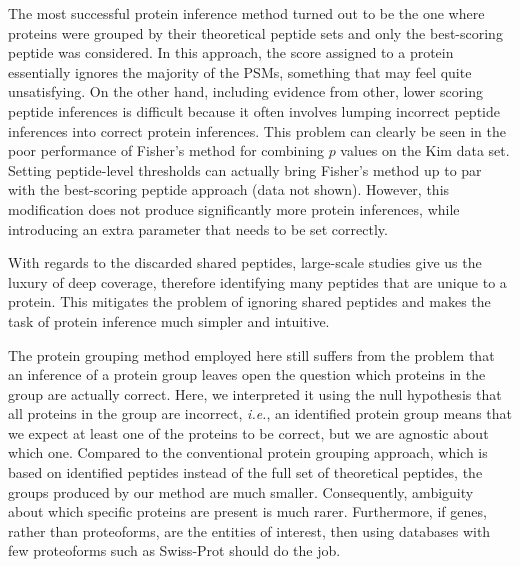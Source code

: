 \documentclass{article}
\begin{document}
The most successful protein inference method turned out to be the one
where proteins were grouped by their theoretical peptide sets and only
the best-scoring peptide was considered. In this approach, the score
assigned to a protein essentially ignores the majority of the PSMs,
something that may feel quite unsatisfying. On the other hand,
including evidence from other, lower scoring peptide inferences
is difficult because it often involves lumping incorrect peptide
inferences into correct protein inferences.  This problem
can clearly be seen in the poor performance of Fisher's method for
combining $p$ values on the Kim data set. Setting peptide-level
thresholds can actually bring Fisher's method up to par with the
best-scoring peptide approach (data not shown). However, this
modification does not produce significantly more protein
inferences, while introducing an extra parameter that needs to be
set correctly.

With regards to the discarded shared peptides, large-scale studies
give us the luxury of deep coverage, therefore identifying many
peptides that are unique to a protein. This mitigates the problem of
ignoring shared peptides and makes the task of protein inference much
simpler and intuitive.  

The protein grouping method employed here still suffers from the
problem that an inference of a protein group leaves open the
question which proteins in the group are actually correct. Here, we
interpreted it using the null hypothesis that all proteins in the
group are incorrect, {\em i.e.}, an identified protein group means
that we expect at least one of the proteins to be correct, but we are
agnostic about which one. Compared to the conventional protein
grouping approach, which is based on identified peptides instead of
the full set of theoretical peptides, the groups produced by our
method are much smaller.  Consequently, ambiguity about which specific
proteins are present is much rarer.  Furthermore, if genes, rather
than proteoforms, are the entities of interest, then using databases
with few proteoforms such as Swiss-Prot should do the job.
\end{document}
